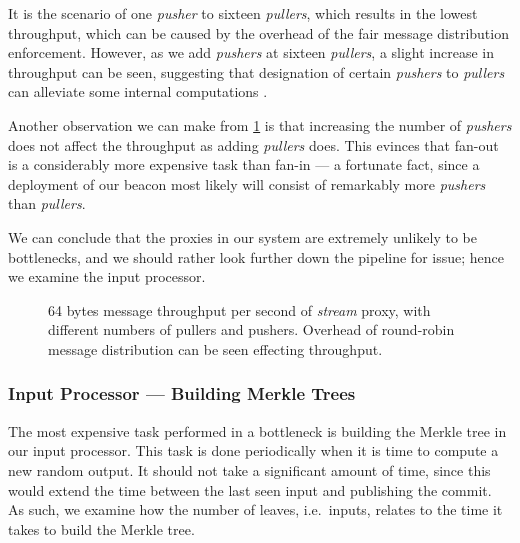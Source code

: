 It is the scenario of one \textit{pusher} to sixteen \textit{pullers}, which results in the lowest throughput, which can be caused by the overhead of the fair message distribution enforcement.
However, as we add \textit{pushers} at sixteen \textit{pullers}, a slight increase in throughput can be seen, suggesting that designation of certain \textit{pushers} to \textit{pullers} can alleviate some internal computations .

Another observation we can make from \cref{fig:proxy_throughput} is that increasing the number of \textit{pushers} does not affect the throughput as adding \textit{pullers} does.
This evinces that fan-out is a considerably more expensive task than fan-in --- a fortunate fact, since a deployment of our beacon most likely will consist of remarkably more \textit{pushers} than \textit{pullers}.

We can conclude that the proxies in our system are extremely unlikely to be bottlenecks, and we should rather look further down the pipeline for issue; hence we examine the input processor.

\begin{figure}
    \centering
    \footnotesize
    \caption{%
        64 bytes message throughput per second of \textit{stream} proxy, with different numbers of pullers and pushers.
Overhead of round-robin message distribution can be seen effecting throughput.}%
    \label{fig:proxy_throughput}
\end{figure}

\subsubsection{Input Processor --- Building Merkle Trees}%
\label{ssub:input_processor_building_merkle_trees}
The most expensive task performed in a bottleneck is building the Merkle tree in our input processor.
This task is done periodically when it is time to compute a new random output.
It should not take a significant amount of time, since this would extend the time between the last seen input and publishing the commit.
As such, we examine how the number of leaves, i.e.\ inputs, relates to the time it takes to build the Merkle tree.

